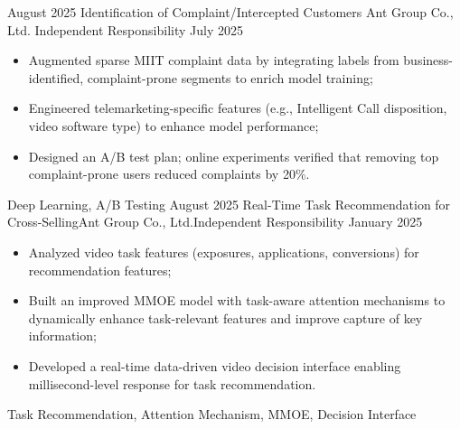 %
%


 
\begin{experiences}
			
 \experience
    {August 2025}   {Identification of Complaint/Intercepted Customers} {Ant Group Co., Ltd.} {Independent Responsibility}
    {July 2025} {
                      \begin{itemize}
                        \item Augmented sparse MIIT complaint data by integrating labels from business-identified, complaint-prone segments to enrich model training;
                        \item Engineered telemarketing-specific features (e.g., Intelligent Call disposition, video software type) to enhance model performance;
                        \item Designed an A/B test plan; online experiments verified that removing top complaint-prone users reduced complaints by 20\%.                                                                                        
                      \end{itemize}
                    }
                    {Deep Learning, A/B Testing}
  \emptySeparator
  \experience
    {August 2025} {Real-Time Task Recommendation for Cross-Selling}{Ant Group Co., Ltd.}{Independent Responsibility}
    {January 2025}    {
                      \begin{itemize}
                        \item Analyzed video task features (exposures, applications, conversions) for recommendation features;
                        \item Built an improved MMOE model with task-aware attention mechanisms to dynamically enhance task-relevant features and improve capture of key information;
                        \item Developed a real-time data-driven video decision interface enabling millisecond-level response for task recommendation.                      
                      \end{itemize}
                    }
                    {Task Recommendation, Attention Mechanism, MMOE, Decision Interface}
	

\end{experiences}
